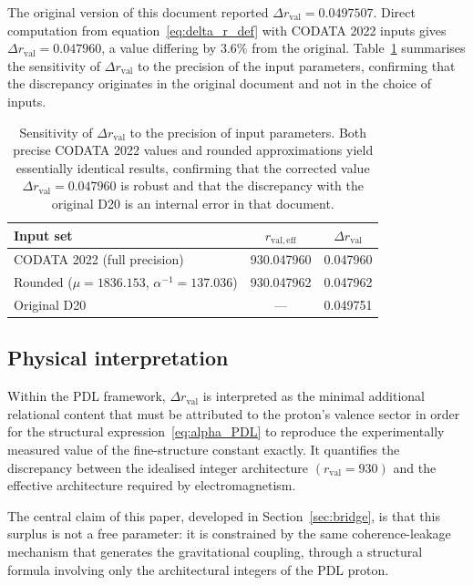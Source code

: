 \documentclass[11pt,a4paper]{article}
\begin{document}
The original version of this document \cite{Universal_Coherence_Leakage_2026} reported $\Delta r_{\mathrm{val}} = 0.0497507$. Direct computation from equation~\eqref{eq:delta_r_def} with CODATA 2022 inputs gives $\Delta r_{\mathrm{val}} = 0.047960$, a value differing by $3.6\%$ from the original. Table~\ref{tab:delta_r_check} summarises the sensitivity of $\Delta r_{\mathrm{val}}$ to the precision of the input parameters, confirming that the discrepancy originates in the original document and not in the choice of inputs.

\begin{table}[ht]
\centering
\caption{Sensitivity of $\Delta r_{\mathrm{val}}$ to the precision of input parameters. Both precise CODATA 2022 values and rounded approximations yield essentially identical results, confirming that the corrected value $\Delta r_{\mathrm{val}} = 0.047960$ is robust and that the discrepancy with the original D20 is an internal error in that document.}

\bigskip

\label{tab:delta_r_check}
\begin{tabular}{lcc}
\toprule
Input set & $r_{\mathrm{val,eff}}$ & $\Delta r_{\mathrm{val}}$ \\
\midrule
CODATA 2022 (full precision) & 930.047960 & 0.047960 \\
Rounded ($\mu = 1836.153$, $\alpha^{-1} = 137.036$) 
                             & 930.047962 & 0.047962 \\
\midrule
Original D20 & --- & 0.049751 \\
\bottomrule
\end{tabular}
\end{table}

\subsection{Physical interpretation}

Within the PDL framework, $\Delta r_{\mathrm{val}}$ is interpreted as the minimal additional relational content that must be attributed to the proton's valence sector in order for the structural expression~\eqref{eq:alpha_PDL} to reproduce the experimentally measured value of the fine-structure constant exactly. It quantifies the discrepancy between the idealised integer architecture $(r_{\mathrm{val}} = 930)$ and the effective architecture required by electromagnetism.

The central claim of this paper, developed in Section~\ref{sec:bridge}, is that this surplus is not a free parameter: it is constrained by the same coherence-leakage mechanism that generates the gravitational coupling, through a structural formula involving only the architectural integers of the PDL proton.
\end{document}
